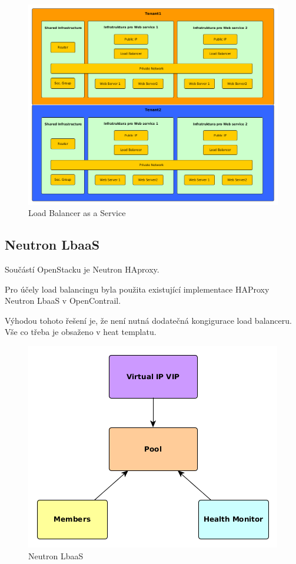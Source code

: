  

\begin{figure}[h]
\begin{centering}
\includegraphics[scale=0.43]{images/LoadBalancer}
\par\end{centering}
\caption{Load Balancer as a Service\label{fig:LoadBalancer}}
\end{figure}

\subsection{Neutron LbaaS}

Součástí OpenStacku je Neutron HAproxy. 

Pro účely load balancingu byla použita existující implementace HAProxy Neutron LbaaS v OpenContrail.

Výhodou tohoto řešení je, že není nutná dodatečná kongigurace load balanceru. Vše co třeba je obsaženo v heat templatu.

\begin{figure}[h]
\begin{centering}
\includegraphics[scale=0.63]{images/NeutronLbaaS}
\par\end{centering}
\caption{Neutron LbaaS\label{fig:NeutronLbaaS}}
\end{figure}


